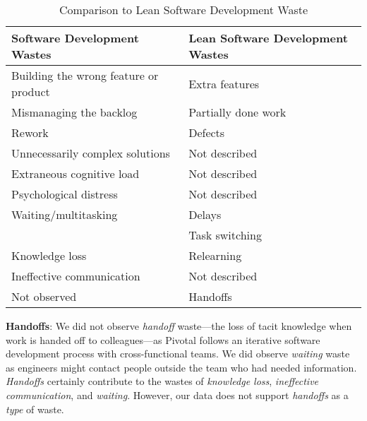 \begin{table}[t]
\renewcommand{\arraystretch}{1.5}
\centering
\caption{Comparison to Lean Software Development Waste}
\label{LeanSoftwareDevelopmentComparisonTable}
\begin{tabular}{|l|l|} %
\hline
Software Development Wastes           & Lean Software Development Wastes \\ \hline
Building the wrong feature or product & Extra features                            \\ \hline
Mismanaging the backlog               & Partially done work                            \\ \hline
Rework                                & Defects                                   \\ \hline
Unnecessarily complex solutions                & Not described                             \\ \hline
Extraneous cognitive load                 & Not described  \\ \hline
Psychological distress                             & Not described \\ \hline
Waiting/multitasking                              & Delays                                    \\  
                  & Task switching  \\ \hline
Knowledge loss                 & Relearning                            \\ \hline
Ineffective communication             & Not described                             \\ \hline
Not observed                          & Handoffs                                  \\ \hline
\end{tabular}
\end{table}




\textbf{Handoffs}: We did not observe \textit{handoff} waste---the loss of tacit knowledge when work is handed off to colleagues---as Pivotal follows an iterative software development process with cross-functional teams. We did observe \textit{waiting} waste as engineers might contact people outside the team who had needed information. \textit{Handoffs} certainly contribute to the wastes of \textit{knowledge loss}, \textit{ineffective communication}, and \textit{waiting}. However, our data does not support \textit{handoffs} as a \textit{type} of waste.

